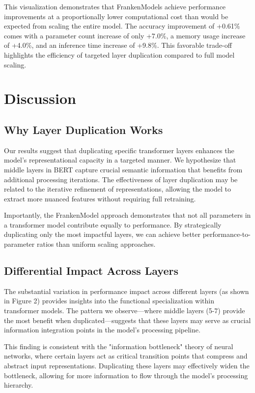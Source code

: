 \documentclass{article}
\begin{document}
This visualization demonstrates that FrankenModels achieve performance improvements at a proportionally lower computational cost than would be expected from scaling the entire model. The accuracy improvement of +0.61\% comes with a parameter count increase of only +7.0\%, a memory usage increase of +4.0\%, and an inference time increase of +9.8\%. This favorable trade-off highlights the efficiency of targeted layer duplication compared to full model scaling.

\section{Discussion}

\subsection{Why Layer Duplication Works}
Our results suggest that duplicating specific transformer layers enhances the model's representational capacity in a targeted manner. We hypothesize that middle layers in BERT capture crucial semantic information that benefits from additional processing iterations. The effectiveness of layer duplication may be related to the iterative refinement of representations, allowing the model to extract more nuanced features without requiring full retraining.

Importantly, the FrankenModel approach demonstrates that not all parameters in a transformer model contribute equally to performance. By strategically duplicating only the most impactful layers, we can achieve better performance-to-parameter ratios than uniform scaling approaches.

\subsection{Differential Impact Across Layers}
The substantial variation in performance impact across different layers (as shown in Figure 2) provides insights into the functional specialization within transformer models. The pattern we observe—where middle layers (5-7) provide the most benefit when duplicated—suggests that these layers may serve as crucial information integration points in the model's processing pipeline.

This finding is consistent with the "information bottleneck" theory of neural networks, where certain layers act as critical transition points that compress and abstract input representations. Duplicating these layers may effectively widen the bottleneck, allowing for more information to flow through the model's processing hierarchy.
\end{document}
